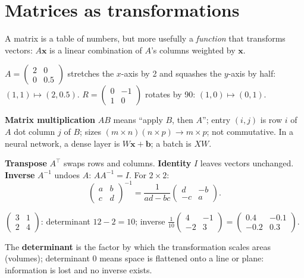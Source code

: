 \section{Matrices as transformations}
A matrix is a table of numbers, but more usefully a \emph{function} that transforms vectors: $A\mathbf x$ is a linear combination of $A$'s columns weighted by $\mathbf x$.
\begin{example}
$A = \begin{pmatrix}2 & 0\\0 & 0.5\end{pmatrix}$ stretches the $x$-axis by 2 and squashes the $y$-axis by half: $(1,1)\mapsto(2, 0.5)$.
$R = \begin{pmatrix}0 & -1\\1 & 0\end{pmatrix}$ rotates by 90\textdegree: $(1,0)\mapsto(0,1)$.
\end{example}
\textbf{Matrix multiplication} $AB$ means ``apply $B$, then $A$''; entry $(i,j)$ is row $i$ of $A$ dot column $j$ of $B$; sizes $(m\times n)(n\times p)\to m\times p$; not commutative.
In a neural network, a dense layer is $W\mathbf x + \mathbf b$; a batch is $XW$.

\textbf{Transpose} $A^\top$ swaps rows and columns. \textbf{Identity} $I$ leaves vectors unchanged. \textbf{Inverse} $A^{-1}$ undoes $A$: $AA^{-1} = I$. For $2\times2$:
\[ \begin{pmatrix}a & b\\c & d\end{pmatrix}^{-1} = \frac{1}{ad - bc}\begin{pmatrix}d & -b\\-c & a\end{pmatrix}. \]
\begin{example}
$\begin{pmatrix}3 & 1\\2 & 4\end{pmatrix}$: determinant $12 - 2 = 10$; inverse $\frac{1}{10}\begin{pmatrix}4 & -1\\-2 & 3\end{pmatrix} = \begin{pmatrix}0.4 & -0.1\\-0.2 & 0.3\end{pmatrix}$.
\end{example}
The \textbf{determinant} is the factor by which the transformation scales areas (volumes); determinant 0 means space is flattened onto a line or plane: information is lost and
no inverse exists.

